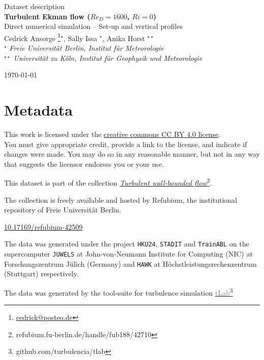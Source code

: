 \documentclass[11pt]{article}
\date{\nodate}
\makeatletter
\newcommand{\dstitle}{Turbulent Ekman flow ($Re_D=1600$, $Ri=0$)}
\newcommand{\subtitle}{Direct numerical simulation -- Set-up and vertical profiles}
\newcommand{\doi}{10.17169/refubium-42509}
\newcommand{\tlabName}{\textcolor{gray}{tLab}}
\newcommand{\authors}{
    Cedrick Ansorge \footnote{\href{mailto:cedrick@posteo.de}{cedrick@posteo.de}}$^\star$, \hspace{0.05cm}  
    Sally Issa $^\star$\hspace{0.05cm},
    Anika Horst $^{\star\star}$ \\[0.5em]
    {\small \light{$^\star$ \emph{ Freie Universit\"at Berlin, Institut f\"ur Meteorologie} \\
    $^{\star\star}$ \emph{Universit\"at zu K\"oln, Institut f\"ur Geophysik und Meteorologie}}}
}
\newcommand{\light}[1]{\textcolor{black!80}{#1}}
\newcommand{\printdoi}[1]{\href{https://dx.doi.org/#1}{#1}}
\makeatother
\begin{document}
{ \selectfont
\begin{centering}

 \light{\large Dataset description} \\[1em] 
 {\LARGE \bfseries \sffamily\dstitle} \\[1em]
 \light{\large\subtitle} \\[1em]
 \authors\\ 
\end{centering}
\light{\hfill \today}
}


\section{Metadata}
\begin{description}
\sffamily
\item[\textcopyright] This work is licensed under the \href{https://creativecommons.org/licenses/by/4.0}{creative commons CC BY 4.0 license}. \\ {\small\light{You must give appropriate credit, provide a link to the license, and indicate if changes were made. You may do so in any reasonable manner, but not in any way that suggests the licensor endorses you or your use. }}
\item[\sffamily Collection] This dataset is part of the collection \href{https://refubium.fu-berlin.de/handle/fub188/42710}{\emph{Turbulent wall-bounded flow}\footnote{\url{refubium.fu-berlin.de/handle/fub188/42710}}}.

{\small \light{The collection is freely available and hosted by Refubium, the  institutional repository of Freie Universit\"at Berlin.}}

\item[\sffamily DOI]\printdoi{\doi}
\item[\sffamily HPC systems] The data was generated under the project \texttt{HKU24}, \texttt{STADIT} and \texttt{TrainABL} on the supercomputer \texttt{JUWELS} at John-von-Neumann Institute for Computing (NIC) at Forschungszentrum J\"ulich (Germany) and \texttt{HAWK} at Höchstleistungsrechenzentrum (Stuttgart)  respectively. 
\item[\sffamily Code] The data was generated by the tool-suite for turbulence simulation \href{https://github.com/turbulencia/tlab}{\tlabName\footnote{\url{github.com/turbulencia/tlab}}}
\end{description}
\end{document}
